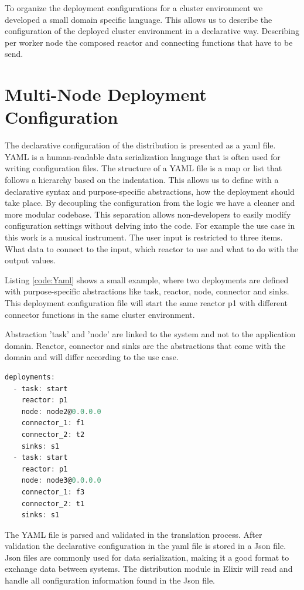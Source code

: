 \documentclass[a4paper]{book}
\begin{document}
To organize the deployment configurations for a cluster environment we developed a small domain specific language. This allows us to describe the configuration of the deployed cluster environment in a declarative way. Describing per worker node the composed reactor and connecting functions that have to be send. 

\section{Multi-Node Deployment Configuration}
The declarative configuration of the distribution is presented as a yaml file. YAML is a human-readable data serialization language that is often used for writing configuration files. The structure of a YAML file is a map or list that follows a hierarchy based on the indentation. This allows us to define with a declarative syntax and purpose-specific abstractions, how the deployment should take place. By decoupling the configuration from the logic we have a cleaner and more modular codebase. This separation allows non-developers to easily modify configuration settings without delving into the code. For example the use case in this work is a musical instrument. The user input is restricted to three items. What data to connect to the input, which reactor to use and what to do with the output values. 

Listing \ref{code:Yaml} shows a small example, where two deployments are defined with purpose-specific abstractions like task, reactor, node, connector and sinks. This deployment configuration file will start the same reactor p1 with different connector functions in the same cluster environment. 

Abstraction 'task' and 'node' are linked to the system and not to the application domain. Reactor, connector and sinks are the abstractions that come with the domain and will differ according to the use case. 


\begin{lstlisting}[language=C, caption={YAML code}, captionpos=b,label={code:Yaml}, basicstyle=\ttfamily\footnotesize, frame=single]
deployments:
  - task: start
    reactor: p1
    node: node2@0.0.0.0
    connector_1: f1
    connector_2: t2
    sinks: s1
  - task: start
    reactor: p1
    node: node3@0.0.0.0
    connector_1: f3
    connector_2: t1
    sinks: s1
\end{lstlisting}

The YAML file is parsed and validated in the translation process. After validation the declarative configuration in the yaml file is stored in a Json file. Json files are commonly used for data serialization, making it a good format to exchange data between systems. The distribution module in Elixir will read and handle all configuration information found in the Json file.
\end{document}

